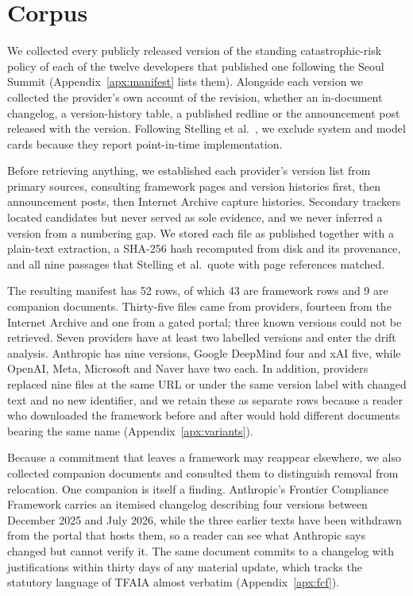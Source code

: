 \documentclass{article}
\begin{document}
\section{Corpus}
\label{sec:corpus}

We collected every publicly released version of the standing catastrophic-risk policy of each of the twelve developers that published one following the Seoul Summit (Appendix~\ref{apx:manifest} lists them). Alongside each version we collected the provider's own account of the revision, whether an in-document changelog, a version-history table, a published redline or the announcement post released with the version. Following Stelling et al.\ \citep{stelling2025evaluating}, we exclude system and model cards because they report point-in-time implementation.

Before retrieving anything, we established each provider's version list from primary sources, consulting framework pages and version histories first, then announcement posts, then Internet Archive capture histories. Secondary trackers located candidates but never served as sole evidence, and we never inferred a version from a numbering gap. We stored each file as published together with a plain-text extraction, a SHA-256 hash recomputed from disk and its provenance, and all nine passages that Stelling et al.\ quote with page references matched.

The resulting manifest has 52 rows, of which 43 are framework rows and 9 are companion documents. Thirty-five files came from providers, fourteen from the Internet Archive and one from a gated portal; three known versions could not be retrieved. Seven providers have at least two labelled versions and enter the drift analysis. Anthropic has nine versions, Google DeepMind four and xAI five, while OpenAI, Meta, Microsoft and Naver have two each. In addition, providers replaced nine files at the same URL or under the same version label with changed text and no new identifier, and we retain these as separate rows because a reader who downloaded the framework before and after would hold different documents bearing the same name (Appendix~\ref{apx:variants}).

Because a commitment that leaves a framework may reappear elsewhere, we also collected companion documents and consulted them to distinguish removal from relocation. One companion is itself a finding. Anthropic's Frontier Compliance Framework carries an itemised changelog describing four versions between December 2025 and July 2026, while the three earlier texts have been withdrawn from the portal that hosts them, so a reader can see what Anthropic says changed but cannot verify it. The same document commits to a changelog with justifications within thirty days of any material update, which tracks the statutory language of TFAIA almost verbatim (Appendix~\ref{apx:fcf}).
\end{document}

